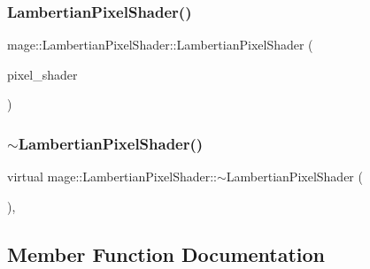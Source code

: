 \hypertarget{classmage_1_1_lambertian_pixel_shader_aadcfc17f23e4a2604703c153d8b411b8}{}\label{classmage_1_1_lambertian_pixel_shader_aadcfc17f23e4a2604703c153d8b411b8} 
\subsubsection{\texorpdfstring{Lambertian\+Pixel\+Shader()}{LambertianPixelShader()}\hspace{0.1cm}{\footnotesize\ttfamily [3/3]}}
{\footnotesize\ttfamily mage\+::\+Lambertian\+Pixel\+Shader\+::\+Lambertian\+Pixel\+Shader (\begin{DoxyParamCaption}\item[{\hyperlink{classmage_1_1_lambertian_pixel_shader}{Lambertian\+Pixel\+Shader} \&\&}]{pixel\+\_\+shader }\end{DoxyParamCaption})\hspace{0.3cm}{\ttfamily [default]}}

\hypertarget{classmage_1_1_lambertian_pixel_shader_aedea7342ae95c6532a086fb28978b5b0}{}\label{classmage_1_1_lambertian_pixel_shader_aedea7342ae95c6532a086fb28978b5b0} 
\subsubsection{\texorpdfstring{$\sim$\+Lambertian\+Pixel\+Shader()}{~LambertianPixelShader()}}
{\footnotesize\ttfamily virtual mage\+::\+Lambertian\+Pixel\+Shader\+::$\sim$\+Lambertian\+Pixel\+Shader (\begin{DoxyParamCaption}{ }\end{DoxyParamCaption})\hspace{0.3cm}{\ttfamily [virtual]}, {\ttfamily [default]}}



\subsection{Member Function Documentation}
\hypertarget{classmage_1_1_lambertian_pixel_shader_a7394a51578de77cd7e57b9bd63895ffd}{}\label{classmage_1_1_lambertian_pixel_shader_a7394a51578de77cd7e57b9bd63895ffd} 
